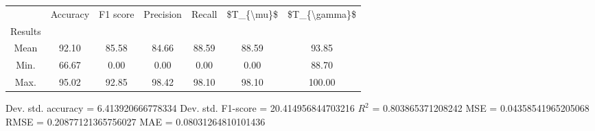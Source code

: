 \begin{tabular}{|c|c|c|c|c|c|c|}
\toprule
{} &  Accuracy &  F1 score &  Precision &  Recall &  \$T\_\{\textbackslash mu\}\$ &  \$T\_\{\textbackslash gamma\}\$ \\
Results &           &           &            &         &            &               \\
\hline
Mean    &     92.10 &     85.58 &      84.66 &   88.59 &      88.59 &         93.85 \\
Min.    &     66.67 &      0.00 &       0.00 &    0.00 &       0.00 &         88.70 \\
Max.    &     95.02 &     92.85 &      98.42 &   98.10 &      98.10 &        100.00 \\
\bottomrule
\end{tabular}

 Dev. std. accuracy = 6.413920666778334
 Dev. std. F1-score = 20.414956844703216
 $R^2$ = 0.803865371208242
 MSE = 0.04358541965205068
 RMSE = 0.20877121365756027
 MAE = 0.08031264810101436